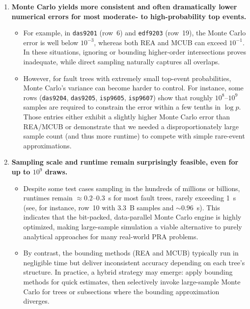 \begin{enumerate}
    \item \textbf{Monte Carlo yields more consistent and often dramatically lower numerical errors for most moderate- to high-probability top events.}
    \begin{itemize}
        \item For example, in \texttt{das9201} (row~6) and \texttt{edf9203} (row~19), the Monte Carlo error is well below \(10^{-3}\), whereas both REA and MCUB can exceed \(10^{-1}\). In these situations, ignoring or bounding higher-order intersections proves inadequate, while direct sampling naturally captures all overlaps.
        \item However, for fault trees with extremely small top-event probabilities, Monte Carlo's variance can become harder to control. For instance, some rows (\texttt{das9204}, \texttt{das9205}, \texttt{isp9605}, \texttt{isp9607}) show that roughly \(10^{8}\)–\(10^{9}\) samples are required to constrain the error within a few tenths in \(\log p\). Those entries either exhibit a slightly higher Monte Carlo error than REA/MCUB or demonstrate that we needed a disproportionately large sample count (and thus more runtime) to compete with simple rare-event approximations.
    \end{itemize}

    \item \textbf{Sampling scale and runtime remain surprisingly feasible, even for up to \(10^{9}\) draws.}
    \begin{itemize}
        \item Despite some test cases sampling in the hundreds of millions or billions, runtimes remain \(\approx 0.2\)–\(0.3\)~s for most fault trees, rarely exceeding 1~s (see, for instance, row~10 with 3.3~B samples and \(\sim 0.96\)~s). This indicates that the bit-packed, data-parallel Monte Carlo engine is highly optimized, making large-sample simulation a viable alternative to purely analytical approaches for many real-world PRA problems.
        \item By contrast, the bounding methods (REA and MCUB) typically run in negligible time but deliver inconsistent accuracy depending on each tree's structure. In practice, a hybrid strategy may emerge: apply bounding methods for quick estimates, then selectively invoke large-sample Monte Carlo for trees or subsections where the bounding approximation diverges.
    \end{itemize}


\end{enumerate}
